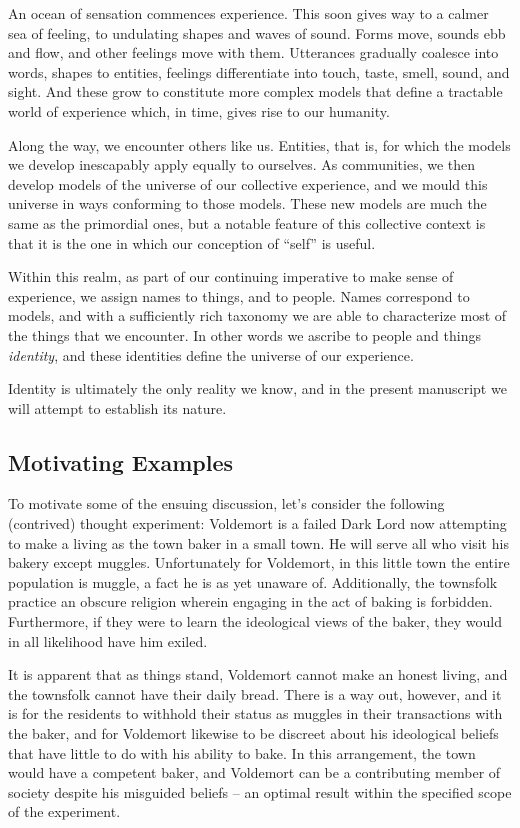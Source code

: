 \documentclass[pra,twocolumn,groupedaddress,10pt]{revtex4}
\theoremstyle{definition}
\begin{document}
An ocean of sensation commences experience. This soon gives way to a calmer sea of feeling, to undulating shapes and waves of sound. Forms move, sounds ebb and flow, and other feelings move with them. Utterances gradually coalesce into words, shapes to entities, feelings differentiate into touch, taste, smell, sound, and sight. And these grow to constitute more complex models that define a tractable world of experience which, in time, gives rise to our humanity.

Along the way, we encounter others like us. Entities, that is, for which the models we develop inescapably apply equally to ourselves. As communities, we then develop models of the universe of our collective experience, and we mould this universe in ways conforming to those models. These new models are much the same as the primordial ones, but a notable feature of this collective context is that it is the one in which our conception of ``self'' is useful.

Within this realm, as part of our continuing imperative to make sense of experience, we assign names to things, and to people. Names correspond to models, and with a sufficiently rich taxonomy we are able to characterize most of the things that we encounter. In other words we ascribe to people and things \textit{identity}, and these identities define the universe of our experience.

Identity is ultimately the only reality we know, and in the present manuscript we will attempt to establish its nature.

\subsection{Motivating Examples} \label{sec:motexa}

To motivate some of the ensuing discussion, let's consider the following (contrived) thought experiment: Voldemort is a failed Dark Lord now attempting to make a living as the town baker in a small town. He will serve all who visit his bakery except muggles. Unfortunately for Voldemort, in this little town the entire population is muggle, a fact he is as yet unaware of. Additionally, the townsfolk practice an obscure religion wherein engaging in the act of baking is forbidden. Furthermore, if they were to learn the ideological views of the baker, they would in all likelihood have him exiled.

It is apparent that as things stand, Voldemort cannot make an honest living, and the townsfolk cannot have their daily bread. There is a way out, however, and it is for the residents to withhold their status as muggles in their transactions with the baker, and for Voldemort likewise to be discreet about his ideological beliefs that have little to do with his ability to bake. In this arrangement, the town would have a competent baker, and Voldemort can be a contributing member of society despite his misguided beliefs -- an optimal result within the specified scope of the experiment.
\end{document}
